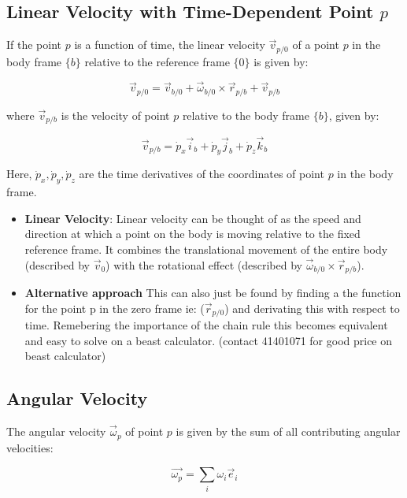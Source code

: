 \subsection{Linear Velocity with Time-Dependent Point \( p \)}

If the point \( p \) is a function of time, the linear velocity \( \vec{v}_{p/0} \) of a point \( p \) in the body frame \( \{b\} \) relative to the reference frame \( \{0\} \) is given by:

\[
\vec{v}_{p/0} = \vec{v}_{b/0} + \vec{\omega}_{b/0} \times \vec{r}_{p/b} + \vec{v}_{p/b}
\]

where \( \vec{v}_{p/b} \) is the velocity of point \( p \) relative to the body frame \( \{b\} \), given by:

\[
\vec{v}_{p/b} = \dot{p}_x \vec{i}_b + \dot{p}_y \vec{j}_b + \dot{p}_z \vec{k}_b
\]

Here, \( \dot{p}_x, \dot{p}_y, \dot{p}_z \) are the time derivatives of the coordinates of point \( p \) in the body frame.


\begin{itemize}
    \item \textbf{Linear Velocity}: Linear velocity can be thought of as the speed and direction at which a point on the body is moving relative to the fixed reference frame. It combines the translational movement of the entire body (described by \( \vec{v}_0 \)) with the rotational effect (described by \( \vec{\omega}_{b/0} \times \vec{r}_{p/b} \)).
    
\end{itemize}
\begin{itemize}
    \item \textbf{Alternative approach}
    This can also just be found by finding a the function for the point p in the zero frame ie:  (\( \vec{r}_{p/0} \)) and derivating this with respect to time. Remebering the importance of the chain rule this becomes equivalent and easy to solve on a beast calculator. (contact 41401071 for good price on beast calculator)
\end{itemize}

\subsection{Angular Velocity}

The angular velocity \( \vec{\omega}_{p} \) of point \( p \) is given by the sum of all contributing angular velocities:

\[
\vec{\omega_{p}} = \sum_{i} \omega_i \vec{e}_i
\]

